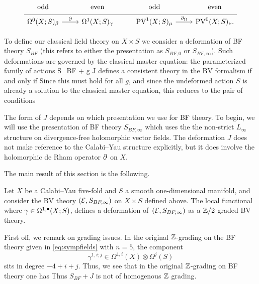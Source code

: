 \begin{equation}
  \label{eq:sympfields} 
  \begin{tikzcd}[row sep = 1 ex]
    {\rm odd} & {\rm even} & {\rm odd} & {\rm even} \\ \hline
    \Omega^{0}(X;S)_\beta \ar[r, "\del"] & \Omega^{1}(X;S)_\gamma & 
     \PV^{1}(X; S)_\mu \ar[r, "\div"] & \PV^{0}(X; S)_\nu.
\end{tikzcd}
\end{equation}

\parsec

To define our classical field theory on $X \times S$ we consider  a deformation of BF theory $S_{BF}$ (this refers to either the presentation as $S_{BF,0}$ or $S_{BF,\infty}$). 
Such deformations are governed by the classical master equation: the parameterized family of actions 
\beqn\label{eqn:defaction}
S_{BF} + g J
\eeqn
defines a consistent theory in the BV formalism if and only if
Since this must hold for all $g$, and since the undeformed action $S$ is already a solution to the classical master equation, this reduces to the pair of conditions

The form of $J$ depends on which presentation we use for BF theory.
To begin, we will use the presentation of BF theory $S_{BF, \infty}$ which uses the the non-strict $L_\infty$ structure on divergence-free holomorphic vector fields.
The deformation $J$ does not make reference to the Calabi--Yau structure explicitly, but it does involve the holomorphic de Rham operator $\partial$ on $X$. 

The main result of this section is the following. 

\begin{thm}
\label{thm:dfn}
Let $X$ be a Calabi--Yau five-fold and $S$ a smooth one-dimensional manifold, and consider the BV theory $(\mathcal E, S_{BF,\infty})$ on $X \times S$ defined above. The local functional 
  where $\gamma \in \Omega^{1,\bullet}(X;S)$, defines a deformation of~$(\mathcal E,S_{BF,\infty})$ as a $\mathbb{Z}/2$-graded BV theory.
\end{thm}

\parsec[]

First off, we remark on grading issues. 
In the original $\mathbb{Z}$-grading on the BF theory given in \eqref{eq:sympfields} with $n=5$, the component 
\[
\gamma^{1,i;j} \in \Omega^{1,i}(X) \otimes \Omega^j(S) 
\]
sits in degree $-4+i+j$. 
Thus, we see that in the original $\mathbb{Z}$-grading on BF theory one has
Thus $S_{BF} + J$ is not of homogenous $\mathbb Z$ grading.

